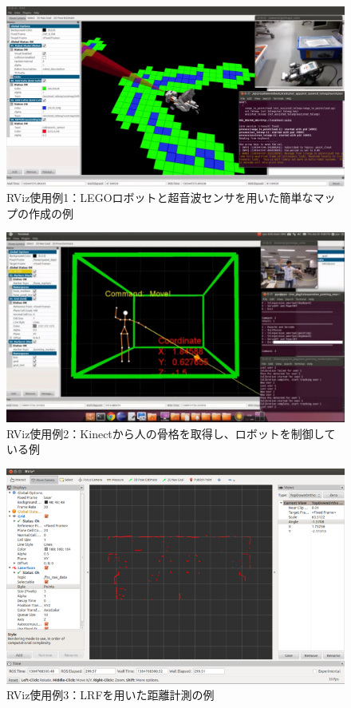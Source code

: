 \begin{figure}[htp]
  \centering
  \includegraphics[width=\columnwidth]{pictures/chapter5/pic_05_01.png}
  \caption{RViz使用例1：LEGOロボットと超音波センサを用いた簡単なマップの作成の例}
\end{figure}

\begin{figure}[htp]
  \centering
  \includegraphics[width=\columnwidth]{pictures/chapter5/pic_05_02.png}
  \caption{RViz使用例2：Kinectから人の骨格を取得し、ロボットを制御している例}
\end{figure}

\begin{figure}[htp]
  \centering
  \includegraphics[width=\columnwidth]{pictures/chapter5/pic_05_03.png}
  \caption{RViz使用例3：LRFを用いた距離計測の例}
\end{figure}

